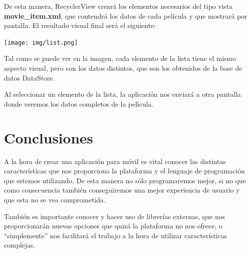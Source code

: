 \documentclass{\ClassPath/viu-tfm-template}
\begin{document}
De esta manera, RecyclerView creará los elementos necesarios del tipo vista \textbf{movie\_item.xml}, que contendrá los datos de cada película y que mostrará por pantalla. El resultado visual final será el siguiente:

\begin{center}
    \texttt{[image: img/list.png]}
\end{center}


Tal como se puede ver en la imagen, cada elemento de la lista tiene el mismo aspecto visual, pero con los datos distintos, que son los obtenidos de la base de datos DataStore.

Al seleccionar un elemento de la lista, la aplicación nos enviará a otra pantalla donde veremos los datos completos de la película.

\chapter{Conclusiones}

A la hora de crear una aplicación para móvil es vital  conocer las distintas características que nos proporciona la plataforma y el lenguaje de programación que estemos utilizando. De esta manera no sólo programaremos mejor, si no que como consecuencia también conseguiremos una mejor experiencia de usuario y que esta no se vea comprometida.

También es importante conocer y hacer uso de librerías externas, que nos proporcionarán nuevas opciones que quizá la plataforma no nos ofrece, o “simplemente” nos facilitará el trabajo a la hora de utilizar características complejas.
\end{document}
